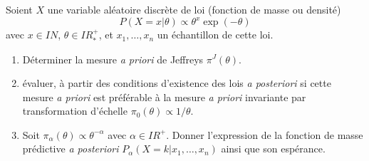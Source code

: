 \documentclass[10pt]{article}
\newcommand{\R}{I\!\!R}
\newcommand{\N}{I\!\!N}
\newcommand{\E}{\mbox{E}}
\newcommand{\V}{\mbox{Var}}
\newcommand{\1}{\mathbbm{1}}
\begin{document}
Soient $X$ une variable al\'eatoire discr\`ete  de loi (fonction de masse ou densit\'e)
$$
P(X=x|\theta) \propto \theta^x \exp(-\theta) 
$$
avec $x\in\N$,  $\theta\in\R^+_*$, et $x_1,\ldots,x_n$ un \'echantillon de cette loi.
\begin{enumerate}
\item D\'eterminer la mesure {\it a priori} de Jeffreys $\pi^J(\theta)$.
\item \'evaluer, \`a partir des conditions d'existence des lois {\it a posteriori} si cette mesure {\it a priori} est pr\'ef\'erable \`a la mesure {\it a priori} invariante par transformation d'\'echelle $\pi_0(\theta)\propto1/\theta$.
\item Soit $\pi_{\alpha}(\theta) \propto \theta^{-\alpha}$ avec $\alpha\in\R^+$. Donner l'expression de la fonction de masse pr\'edictive {\it a posteriori} $P_{\alpha}(X=k|x_1,\ldots,x_n)$ ainsi que son esp\'erance.  %
\end{enumerate}
\end{document}
